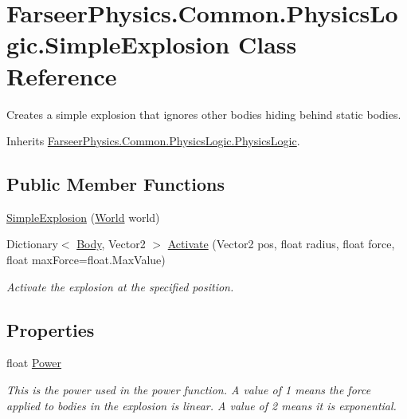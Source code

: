 \hypertarget{class_farseer_physics_1_1_common_1_1_physics_logic_1_1_simple_explosion}{\section{Farseer\+Physics.\+Common.\+Physics\+Logic.\+Simple\+Explosion Class Reference}
\label{class_farseer_physics_1_1_common_1_1_physics_logic_1_1_simple_explosion}
}


Creates a simple explosion that ignores other bodies hiding behind static bodies.  




Inherits \hyperlink{class_farseer_physics_1_1_common_1_1_physics_logic_1_1_physics_logic}{Farseer\+Physics.\+Common.\+Physics\+Logic.\+Physics\+Logic}.

\subsection*{Public Member Functions}
\begin{DoxyCompactItemize}
\item 
\hyperlink{class_farseer_physics_1_1_common_1_1_physics_logic_1_1_simple_explosion_a9db70ebef114b09cf27fc2848f5a49a3}{Simple\+Explosion} (\hyperlink{class_farseer_physics_1_1_dynamics_1_1_world}{World} world)
\item 
Dictionary$<$ \hyperlink{class_farseer_physics_1_1_dynamics_1_1_body}{Body}, Vector2 $>$ \hyperlink{class_farseer_physics_1_1_common_1_1_physics_logic_1_1_simple_explosion_a40bece2c08476a43e43a06cda6fd1dce}{Activate} (Vector2 pos, float radius, float force, float max\+Force=float.\+Max\+Value)
\begin{DoxyCompactList}\small\item\em Activate the explosion at the specified position. \end{DoxyCompactList}\end{DoxyCompactItemize}
\subsection*{Properties}
\begin{DoxyCompactItemize}
\item 
float \hyperlink{class_farseer_physics_1_1_common_1_1_physics_logic_1_1_simple_explosion_a1289d023050b9f35e6fa2fd3d4133630}{Power}
\begin{DoxyCompactList}\small\item\em This is the power used in the power function. A value of 1 means the force applied to bodies in the explosion is linear. A value of 2 means it is exponential. \end{DoxyCompactList}\end{DoxyCompactItemize}
